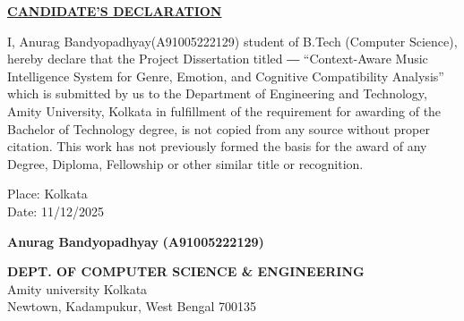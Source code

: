 \documentclass[12pt,a4paper]{report}
\begin{document}
\begin{center}
\textbf{\underline{CANDIDATE’S DECLARATION}}\\
\end{center}
\vspace{1.2cm}
I, Anurag Bandyopadhyay(A91005222129) student of B.Tech (Computer Science), hereby declare that the Project Dissertation titled ― “Context-Aware Music Intelligence System for Genre, Emotion, and Cognitive Compatibility Analysis” which is submitted by us to the Department of Engineering and Technology, Amity University, Kolkata in fulfillment of the requirement for awarding of the Bachelor of Technology degree, is not copied from any source without proper citation. This work has not previously formed the basis for the award of any Degree, Diploma, Fellowship or other similar title or recognition.

\noindent \begin{minipage}{4cm}
\begin{flushleft}
\vspace{5 cm}
                         
Place: Kolkata\\
Date: 11/12/2025\\

\end{flushleft} 
\end{minipage}
\hfill
\begin{minipage}{12cm}
\begin{flushright}                                      
\vspace{5 cm}
\vspace{1cm}
\textbf{Anurag Bandyopadhyay}
\vspace{0.2cm}
\textbf{(A91005222129)}\\
\vspace{0.2cm}


\end{flushright} 
\end{minipage}

\newpage
\begin{center}
\textbf{DEPT. OF COMPUTER SCIENCE \& ENGINEERING}\\
Amity university Kolkata \\
Newtown, Kadampukur, West Bengal 700135\\
\end{center}
\end{document}
